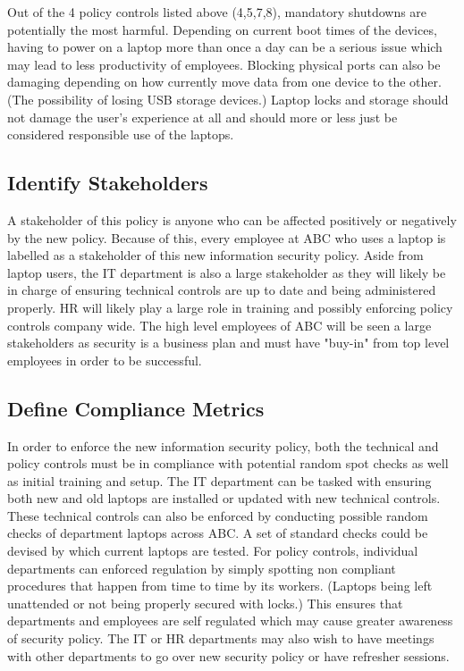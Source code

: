 \documentclass[paper=a4, fontsize=11pt]{scrartcl} %
\numberwithin{equation}{section} %
\numberwithin{figure}{section} %
\numberwithin{table}{section} %
\begin{document}
Out of the 4 policy controls listed above (4,5,7,8), mandatory shutdowns are
potentially the most harmful. Depending on current boot times of the devices,
having to power on a laptop more than once a day can be a serious issue which
may lead to less productivity of employees. Blocking physical ports can also
be damaging depending on how currently move data from one device to the other.
(The possibility of losing USB storage devices.) Laptop locks and storage should
not damage the user's experience at all and should more or less just be 
considered responsible use of the laptops.


\subsection{Identify Stakeholders}

A stakeholder of this policy is anyone who can be affected positively or 
negatively by the new policy. Because of this, every employee at ABC who uses
a laptop is labelled as a stakeholder of this new information security policy.
Aside from laptop users, the IT department is also a large stakeholder as they
will likely be in charge of ensuring technical controls are up to date and 
being administered properly. HR will likely play a large role in training and
possibly enforcing policy controls company wide. The high level employees of
ABC will be seen a large stakeholders as security is a business plan and must
have "buy-in" from top level employees in order to be successful.


\subsection{Define Compliance Metrics}

In order to enforce the new information security policy, both the technical
and policy controls must be in compliance with potential random spot checks
as well as initial training and setup. The IT department can be tasked with
ensuring both new and old laptops are installed or updated with new technical
controls. These technical controls can also be enforced by conducting possible
random checks of department laptops across ABC. A set of standard checks could
be devised by which current laptops are tested. For policy controls, individual
departments can enforced regulation by simply spotting non compliant procedures
that happen from time to time by its workers. (Laptops being left unattended 
or not being properly secured with locks.) This ensures that departments and
employees are self regulated which may cause greater awareness of security 
policy. The IT or HR departments may also wish to have meetings with other
departments to go over new security policy or have refresher sessions.
\end{document}
